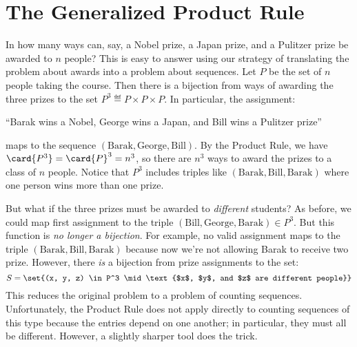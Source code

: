 \section{The Generalized Product Rule}\label{generalized_product_sec}
In how many ways can, say, a Nobel prize, a Japan prize, and a
Pulitzer prize be awarded to $n$ people?  This is easy to answer using
our strategy of translating the problem about awards into a problem
about sequences.  Let $P$ be the set of $n$ people taking the course.
Then there is a bijection from ways of awarding the three prizes to
the set $P^3 \eqdef P \times P \times P$.  In particular, the
assignment:
\begin{center}
``Barak wins a Nobel, George wins a Japan, and Bill wins a Pulitzer prize''
\end{center}
maps to the sequence $(\text{Barak}, \text{George}, \text{Bill})$.  By
the Product Rule, we have $\card{P^3}= \card{P}^3 = n^3$, so there are
$n^3$ ways to award the prizes to a class of $n$ people.  Notice that
$P^3$ includes triples like $(\text{Barak}, \text{Bill},
\text{Barak})$ where one person wins more than one prize.

But what if the three prizes must be awarded to \emph{different}
students?  As before, we could map first assignment to the triple
$(\text{Bill}, \text{George}, \text{Barak}) \in P^3$.  But this
function is \emph{no longer a bijection}.  For example, no valid
assignment maps to the triple $(\text{Barak}, \text{Bill},
\text{Barak})$ because now we're not allowing Barak to receive two
prize.  However, there \emph{is} a bijection from prize assignments to
the set:
\[
S = \set{(x, y, z) \in P^3 \mid \text{$x$, $y$, and $z$ are different people}}
\]
This reduces the original problem to a problem of counting sequences.
Unfortunately, the Product Rule does not apply directly to counting
sequences of this type because the entries depend on one another; in
particular, they must all be different.  However, a slightly sharper
tool does the trick.


